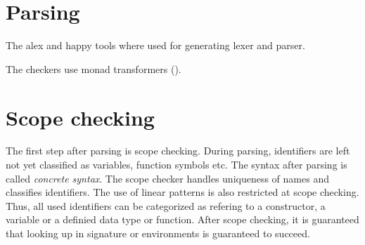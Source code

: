 \section{Parsing}
The alex \cite{alex} and happy \cite{happy} tools where used for generating lexer and parser.

The checkers use monad transformers (\cite{Grabmueller2006MonadTransformers}).

\section{Scope checking}
The first step after parsing is scope checking.
During parsing, identifiers are left not yet classified as variables, function symbols etc.
The syntax after parsing is called \emph{concrete syntax}.
The scope checker handles uniqueness of names and classifies identifiers. 
The use of linear patterns is also restricted at scope checking.
Thus, all used identifiers can be categorized as refering to a constructor, a variable or a definied data type or
function.
After scope checking, it is guaranteed that looking up in signature or environments is guaranteed to succeed.




